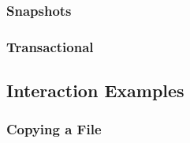 \subsubsection{Snapshots}

\subsubsection{Transactional}

\subsection{Interaction Examples}

\subsubsection{Copying a File}

